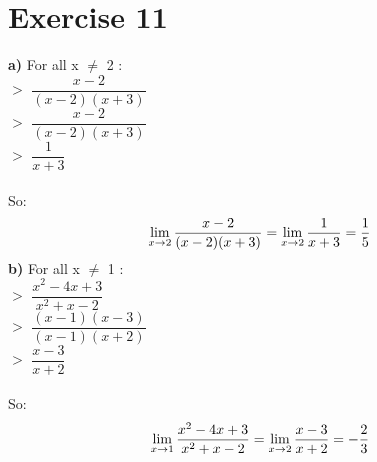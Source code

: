 \documentclass{article}
\begin{document}
  
  \section*{Exercise 11}
  
  \textbf{a)} For all x $\neq$ 2 : \\ 
  $>$ $\dfrac{x-2}{(x-2)(x+3)}$ \\
  $>$ $\dfrac{x-2}{(x-2)(x+3)}$ \\
  $>$ $\dfrac{1}{x+3}$ \\ \\
  So: 
  $$\lim_{x\to2} \dfrac{x-2}{(x-2)(x+3)} = \lim_{x\to2} \\ \\ \dfrac{1}{x+3} = \dfrac{1}{5}$$
  \textbf{b)} For all x $\neq$ 1 : \\
  $>$ $\dfrac{x^2 -4x + 3}{x^2 + x - 2}$ \\
  $>$ $\dfrac{(x-1)(x-3)}{(x-1)(x+2)}$ \\
  $>$ $\dfrac{x-3}{x+2}$ \\ \\
  So:
  $$\lim_{x\to1} \dfrac{x^2 -4x + 3}{x^2 + x - 2} = \lim_{x\to2} \\ \\ \dfrac{x-3}{x+2} = -\dfrac{2}{3}$$
  
  
\end{document}
